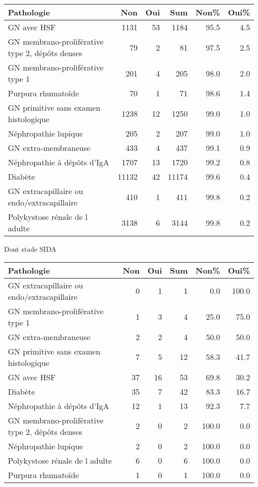 \documentclass[11pt,a4paper]{article}\usepackage[]{graphicx}\usepackage[]{color}
\begin{document}
\begin{table}[H]
\centering
\begin{tabular}{lrrrrr}
  \hline
Pathologie & Non & Oui & Sum & Non\% & Oui\% \\ 
  \hline
GN avec HSF & 1131 & 53 & 1184 & 95.5 & 4.5 \\ 
  GN membrano-proliférative type 2, dépôts denses & 79 &  2 & 81 & 97.5 & 2.5 \\ 
  GN membrano-proliférative type 1 & 201 &  4 & 205 & 98.0 & 2.0 \\ 
  Purpura rhumatoïde & 70 &  1 & 71 & 98.6 & 1.4 \\ 
  GN primitive sans examen histologique & 1238 & 12 & 1250 & 99.0 & 1.0 \\ 
  Néphropathie lupique & 205 &  2 & 207 & 99.0 & 1.0 \\ 
  GN extra-membraneuse & 433 &  4 & 437 & 99.1 & 0.9 \\ 
  Néphropathie à dépôts d'IgA & 1707 & 13 & 1720 & 99.2 & 0.8 \\ 
  Diabète & 11132 & 42 & 11174 & 99.6 & 0.4 \\ 
  GN extracapillaire ou endo/extracapillaire & 410 &  1 & 411 & 99.8 & 0.2 \\ 
  Polykystose rénale de l adulte & 3138 &  6 & 3144 & 99.8 & 0.2 \\ 
   \hline
\end{tabular}
\end{table}


Dont stade SIDA 

\begin{table}[H]
\centering
\begin{tabular}{lrrrrr}
  \hline
Pathologie & Non & Oui & Sum & Non\% & Oui\% \\ 
  \hline
GN extracapillaire ou endo/extracapillaire &  0 &  1 &  1 & 0.0 & 100.0 \\ 
  GN membrano-proliférative type 1 &  1 &  3 &  4 & 25.0 & 75.0 \\ 
  GN extra-membraneuse &  2 &  2 &  4 & 50.0 & 50.0 \\ 
  GN primitive sans examen histologique &  7 &  5 & 12 & 58.3 & 41.7 \\ 
  GN avec HSF & 37 & 16 & 53 & 69.8 & 30.2 \\ 
  Diabète & 35 &  7 & 42 & 83.3 & 16.7 \\ 
  Néphropathie à dépôts d'IgA & 12 &  1 & 13 & 92.3 & 7.7 \\ 
  GN membrano-proliférative type 2, dépôts denses &  2 &  0 &  2 & 100.0 & 0.0 \\ 
  Néphropathie lupique &  2 &  0 &  2 & 100.0 & 0.0 \\ 
  Polykystose rénale de l adulte &  6 &  0 &  6 & 100.0 & 0.0 \\ 
  Purpura rhumatoïde &  1 &  0 &  1 & 100.0 & 0.0 \\ 
   \hline
\end{tabular}
\end{table}
\end{document}
